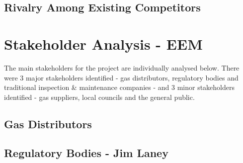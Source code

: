 \documentclass[11pt]{article}		%
\begin{document}
		\subsection[Rivalry Among Existing Competitors]{Rivalry Among Existing Competitors}
		
	\section{Stakeholder Analysis - EEM}
	
		The main stakeholders for the project are individually analysed below.
		There were 3 major stakeholders identified - gas distributors, regulatory bodies and traditional inspection \& maintenance companies - and 3 minor stakeholders identified - gas suppliers, local councils and the general public.
		
		\subsection[Gas Distributors]{Gas Distributors}
		
		\subsection[Regulatory Bodies]{Regulatory Bodies - Jim Laney}
			
\end{document}
